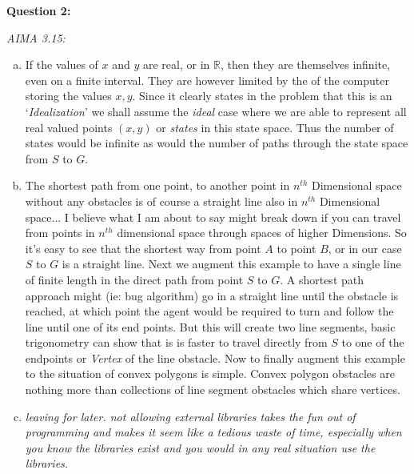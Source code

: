 \noindent\textbf{Question 2:}


\noindent\emph{AIMA 3.15:}
\noindent\begin{enumerate}[a)]


\item If the values of $x$ and $y$ are real, or in $\mathbb{R}$, then they are themselves infinite, even on a finite interval. They are however limited by the  of the computer storing the values $x,y$. Since it clearly states in the problem that this is an `\emph{Idealization}' we shall assume the \emph{ideal} case where we are able to represent all real valued points $(x,y)$ or \emph{states} in this state space. Thus the number of states would be infinite as would the number of paths through the state space from $S$ to $G$.


\item The shortest path from one point, to another point in $n^{th}$ Dimensional space without any obstacles is of course a straight line also in $n^{th}$ Dimensional space... I believe what I am about to say might break down if you can travel from points in $n^{th}$ dimensional space through spaces of higher Dimensions. So it's easy to see that the shortest way from point $A$ to point $B$, or in our case $S$ to $G$ is a straight line. Next we augment this example to have a single line of finite length in the direct path from point $S$ to $G$. A shortest path approach might (ie: bug algorithm) go in a straight line until the obstacle is reached, at which point the agent would be required to turn and follow  the line until one of its end points. But this will create two line segments, basic trigonometry can show that is is faster to travel directly from $S$ to one of the endpoints or \emph{Vertex} of the line obstacle. Now to finally augment this example to the situation of convex polygons is simple. Convex polygon obstacles are nothing more than collections of line segment obstacles which share vertices. 


\item \emph{leaving for later. not allowing external libraries takes the fun out of programming and makes it seem like a tedious waste of time, especially when you know the libraries exist and you would in any real situation use the libraries.} 


\end{enumerate}

